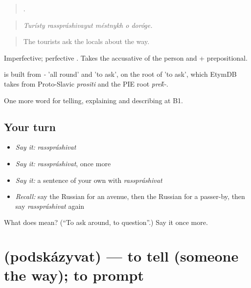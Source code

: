 \begin{quote}
    .
\end{quote}

\begin{quote}
\emph{Turísty rasspráshivayut méstnykh o doróge.}
\end{quote}

\begin{quote}
The tourists ask the locals about the way.
\end{quote}

Imperfective; perfective \emph{}. Takes the accusative of the person and \emph{} + prepositional.

\begin{cousinweb}
\emph{} is built from \emph{-} 'all round' and \emph{} 'to ask', on the root of \emph{} 'to ask', which EtymDB takes from Proto-Slavic \emph{prositi} and the PIE root \emph{pre\'{k}-}.
\end{cousinweb}

\begin{grammarlens}[title={What you've built}]
One more word for telling, explaining and describing at B1.
\end{grammarlens}

\subsection*{Your turn}
\begin{itemize}
\raggedright
  \item \emph{Say it:} \emph{rasspráshivat}
  \item \emph{Say it:} \emph{rasspráshivat}, once more
  \item \emph{Say it:} a sentence of your own with \emph{rasspráshivat}
  \item \emph{Recall:} say the Russian for an avenue, then the Russian for a passer-by, then say \emph{rasspráshivat} again
\end{itemize}

\begin{tcolorbox}[breakable,colback=teal!4,colframe=teal!35!black,title={Before you move on}]
What does  mean? (\textquotedblleft{}To ask around, to question\textquotedblright{}.) Say it once more.
\end{tcolorbox}
\section[\texorpdfstring{\ru{подсказывать} (podskázyvat)}{подсказывать (podskázyvat)}]{ (podskázyvat) — to tell (someone the way); to prompt}

